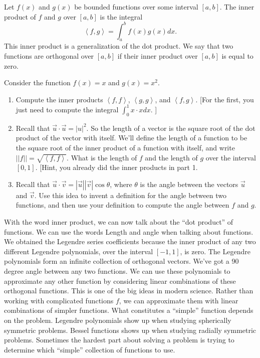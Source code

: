 \begin{definition}
Let $f(x)$ and $g(x)$ be bounded functions over some interval $[a,b]$. The inner product of $f$ and $g$ over $[a,b]$ is the integral  
$$\left<f,g\right> = \int_a^b f(x)g(x) dx.$$ 
This inner product is a generalization of the dot product.  We say that two functions are orthogonal over $[a,b]$ if their inner product over $[a,b]$ is equal to zero.
\end{definition}

\begin{problem}
Consider the function $f(x) = x$ and $g(x)=x^2$. 
\begin{enumerate}
 \item Compute the inner products $\left<f,f\right>$, $\left<g,g\right>$, and $\left<f,g\right>$. [For the first, you just need to compute the integral $\int_0^1 x\cdot x dx$. ]
 \item Recall that $\vec u\cdot \vec u = |u|^2$. So the length of a vector is the square root of the dot product of the vector with itself. We'll define the length of a function to be the square root of the inner product of a function with itself, and write $||f|| = \sqrt{\left<f,f\right>}.$ What is the length of $f$ and the length of $g$ over the interval $[0,1]$. [Hint, you already did the inner products in part 1.  
 \item Recall that $\vec u\cdot \vec v = |\vec u||\vec v|\cos\theta$, where $\theta$ is the angle between the vectors $\vec u$ and $\vec v$. Use this idea to invent a definition for the angle between two functions, and then use your definition to compute the angle between $f$ and $g$.  
\end{enumerate}
\end{problem}


With the word inner product, we can now talk about the ``dot product'' of functions.  We can use the words Length and angle when talking about functions.  We obtained the Legendre series coefficients because the inner product of any two different Legendre polynomials, over the interval $[-1,1]$, is zero. The Legendre polynomials form an infinite collection of orthogonal vectors. We've got a 90 degree angle between any two functions. We can use these polynomials to approximate any other function by considering linear combinations of these orthogonal functions.  This is one of the big ideas in modern science.  Rather than working with complicated functions $f$, we can approximate them with linear combinations of simpler functions.  What constitutes a ``simple'' function depends on the problem.  Legendre polynomials show up when studying spherically symmetric problems.  Bessel functions shows up when studying radially symmetric problems. Sometimes the hardest part about solving a problem is trying to determine which ``simple'' collection of functions to use.    

